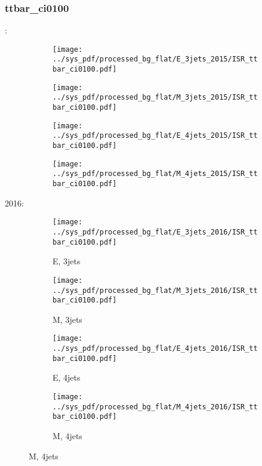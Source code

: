 \documentclass{beamer}
\begin{document}
\begin{frame}
\frametitle{ttbar_ci0100}
\fontsize{5}{1}:
\begin{figure}
\centering
\begin{subfigure}[b]{0.24\textwidth}
\texttt{[image: ../sys\_pdf/processed\_bg\_flat/E\_3jets\_2015/ISR\_ttbar\_ci0100.pdf]}
\end{subfigure}
\begin{subfigure}[b]{0.24\textwidth}
\texttt{[image: ../sys\_pdf/processed\_bg\_flat/M\_3jets\_2015/ISR\_ttbar\_ci0100.pdf]}
\end{subfigure}
\begin{subfigure}[b]{0.24\textwidth}
\texttt{[image: ../sys\_pdf/processed\_bg\_flat/E\_4jets\_2015/ISR\_ttbar\_ci0100.pdf]}
\end{subfigure}
\begin{subfigure}[b]{0.24\textwidth}
\texttt{[image: ../sys\_pdf/processed\_bg\_flat/M\_4jets\_2015/ISR\_ttbar\_ci0100.pdf]}
\end{subfigure}
\end{figure}
2016:
\begin{figure}
\centering
\begin{subfigure}[b]{0.24\textwidth}
\texttt{[image: ../sys\_pdf/processed\_bg\_flat/E\_3jets\_2016/ISR\_ttbar\_ci0100.pdf]}
\captionsetup{font=tiny}
\caption{E, 3jets}
\end{subfigure}
\begin{subfigure}[b]{0.24\textwidth}
\texttt{[image: ../sys\_pdf/processed\_bg\_flat/M\_3jets\_2016/ISR\_ttbar\_ci0100.pdf]}
\captionsetup{font=tiny}
\caption{M, 3jets}
\end{subfigure}
\begin{subfigure}[b]{0.24\textwidth}
\texttt{[image: ../sys\_pdf/processed\_bg\_flat/E\_4jets\_2016/ISR\_ttbar\_ci0100.pdf]}
\captionsetup{font=tiny}
\caption{E, 4jets}
\end{subfigure}
\begin{subfigure}[b]{0.24\textwidth}
\texttt{[image: ../sys\_pdf/processed\_bg\_flat/M\_4jets\_2016/ISR\_ttbar\_ci0100.pdf]}
\captionsetup{font=tiny}
\caption{M, 4jets}
\end{subfigure}
\end{figure}
\end{frame}
\end{document}
